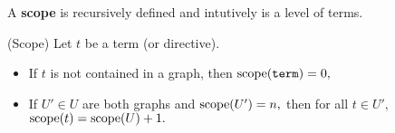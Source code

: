 A \textbf{scope} is recursively defined and intutively is a level of terms.
\begin{definition} (Scope)
 Let $t$ be a term (or directive).
  \begin{itemize}
	\item If $t$ is not contained in a graph, then $\textrm{scope}(\texttt{term}) = 0,$
    \item If $U' \in U$ are both graphs and $\textrm{scope}(U') = n,$ then for all $t \in U',$ $\textrm{scope}(t) = \textrm{scope}(U) + 1.$
  \end{itemize}
\end{definition}

